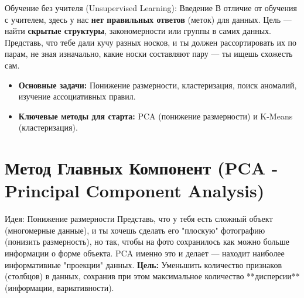 
\begin{textbox}{Обучение без учителя (Unsupervised Learning): Введение}
    В отличие от обучения с учителем, здесь у нас \textbf{нет правильных ответов} (меток) для данных. Цель — найти \textbf{скрытые структуры}, закономерности или группы в самих данных. Представь, что тебе дали кучу разных носков, и ты должен рассортировать их по парам, не зная изначально, какие носки составляют пару — ты ищешь схожесть сам.
    \begin{itemize}
        \item \textbf{Основные задачи:} Понижение размерности, кластеризация, поиск аномалий, изучение ассоциативных правил.
        \item \textbf{Ключевые методы для старта:} PCA (понижение размерности) и K-Means (кластеризация).
    \end{itemize}
\end{textbox}

\section{Метод Главных Компонент (PCA - Principal Component Analysis)}

\begin{myblock}{Идея: Понижение размерности}
    Представь, что у тебя есть сложный объект (многомерные данные), и ты хочешь сделать его "плоскую" фотографию (понизить размерность), но так, чтобы на фото сохранилось как можно больше информации о форме объекта. PCA именно это и делает — находит наиболее информативные "проекции" данных.
    \vspace{0.5ex} %
    \textbf{Цель:} Уменьшить количество признаков (столбцов) в данных, сохранив при этом максимальное количество **дисперсии** (информации, вариативности).
\end{myblock}

